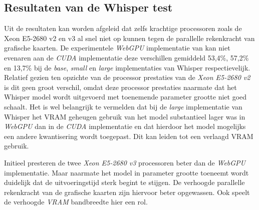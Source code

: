 



\subsection*{Resultaten van de Whisper test}

Uit de resultaten kan worden afgeleid dat zelfs krachtige processoren zoals de Xeon E5-2680 v2 en v3 al snel niet op kunnen tegen de parallelle rekenkracht van grafische kaarten. De experimentele \textit{WebGPU} implementatie van \textcite{Fleetwood2024} kan niet evenaren aan de \textit{CUDA} implementatie deze verschillen gemiddeld 53,4\%, 57,2\% en 13,7\% bij de \textit{base}, \textit{small} en \textit{large} implementaties van Whisper respectievelijk. Relatief gezien ten opzichte van de processor prestaties van de \textit{Xeon E5-2680 v2} is dit geen groot verschil, omdat deze processor prestaties naarmate dat het Whisper model wordt uitgevoerd met toenemende parameter grootte niet goed schaalt. Het is wel belangrijk te vermelden dat bij de \textit{large} implementatie van Whisper het VRAM geheugen gebruik van het model substantieel lager was in \textit{WebGPU} dan in de \textit{CUDA} implementatie en dat hierdoor het model mogelijks een andere kwantisering wordt toegepast. Dit kan leiden tot een verlaagd VRAM gebruik.

\bigbreak{}

Initieel presteren de twee \textit{Xeon E5-2680 v3} processoren beter dan de \textit{WebGPU} implementatie. Maar naarmate het model in parameter grootte toeneemt wordt duidelijk dat de uitvoeringstijd sterk begint te stijgen. De verhoogde parallelle rekenkracht van de grafische kaarten zijn hiervoor beter opgewassen. Ook speelt de verhoogde \textit{VRAM} bandbreedte hier een rol. 

\bigbreak{}

